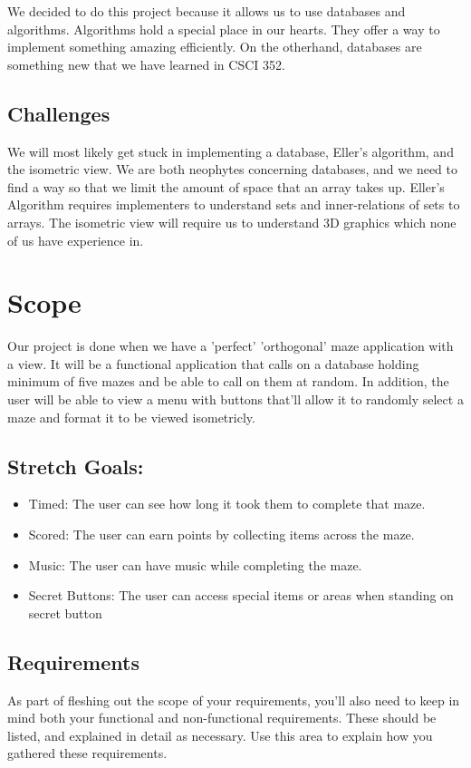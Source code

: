 \documentclass[10pt,conference,onecolumn,compsoc]{IEEEtran}
\begin{document}
We decided to do this project because it allows us to use databases and algorithms. Algorithms hold a special place in our hearts. They offer a way to implement something amazing efficiently. On the otherhand, databases are something new that we have learned in CSCI 352.


\subsection{Challenges}
We will most likely get stuck in implementing a database, Eller's algorithm, and the isometric view. We are both neophytes concerning databases, and we need to find a way so that we limit the amount of space that an array takes up. Eller's Algorithm requires implementers to understand sets and inner-relations of sets to arrays. The isometric view will require us to understand 3D graphics which none of us have experience in. 


\section{Scope}
Our project is done when we have a 'perfect' 'orthogonal' maze application with a view. It will be a functional application that calls on a database holding minimum of five mazes and be able to call on them at random. In addition, the user will be able to view a menu with buttons that'll allow it to randomly select a maze and format it to be viewed isometricly. 
\subsection{Stretch Goals:}
\begin{itemize}
\item Timed: The user can see how long it took them to complete that maze.
\item Scored: The user can earn points by collecting items across the maze.
\item Music: The user can have music while completing the maze.
\item Secret Buttons: The user can access special items or areas when standing on secret button

\end{itemize}


\subsection{Requirements}
As part of fleshing out the scope of your requirements, you'll also need to keep in mind both your functional and non-functional requirements.  These should be listed, and explained in detail as necessary.  Use this area to explain how you gathered these requirements.
\end{document}
